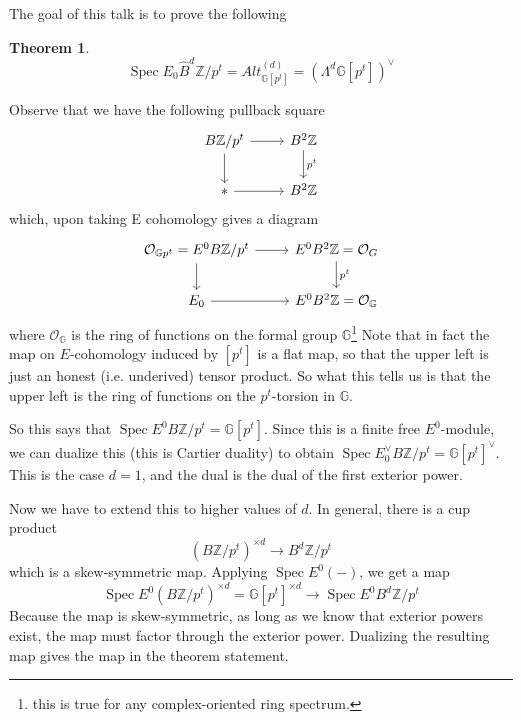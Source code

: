\documentclass{article}
\newcommand{\Z}{{\mathbb{Z}}}
\renewcommand{\G}{{\mathbb{G}}}
\DeclareMathOperator{\Spec}{Spec}
\theoremstyle{definition} \newtheorem*{defn}{Definition}
\theoremstyle{plain} \newtheorem*{prop}{Proposition}
\theoremstyle{plain} \newtheorem*{lemma}{Lemma}
\theoremstyle{plain} \newtheorem*{cor}{Corollary}
\theoremstyle{remark} \newtheorem*{ex}{Example}
\theoremstyle{remark} \newtheorem*{exs}{Examples}
\theoremstyle{remark} \newtheorem*{nonex}{Non-example}
\theoremstyle{remark} \newtheorem*{rmk}{Remark}
\theoremstyle{remark} \newtheorem*{exc}{Exercise}
\theoremstyle{remark} \newtheorem*{idea}{Idea}
\theoremstyle{remark} \newtheorem*{obs}{Observation}
\theoremstyle{plain} \newtheorem*{theorem}{Theorem}
\theoremstyle{plain} \newtheorem*{conj}{Conjecture}
\theoremstyle{remark} \newtheorem*{q}{Question}
\theoremstyle{definition} \newtheorem*{fact}{Fact}
\theoremstyle{definition} \newtheorem*{facts}{Facts}
\theoremstyle{remark} \newtheorem*{ntn}{Notation}
\theoremstyle{remark} \newtheorem*{goal}{Goal}
\theoremstyle{remark} \newtheorem*{sketch}{Sketch}
\theoremstyle{definition} \newtheorem{claim}{Claim}
\newenvironment{proofsketch}{%
  \renewcommand{\proofname}{Proof Sketch}\proof}{\endproof}
\begin{document}
The goal of this talk is to prove the following
\begin{theorem}
	\begin{equation}\label{eq:pvkthm1} 
		\Spec E_0\hat B^d \Z/p^t  = Alt^{(d)}_{\G[p^t]} = \left(\Lambda^d \G[p^t] \right)^\vee 
	\end{equation}
\end{theorem}
\begin{proofsketch}[Case d = 1]
	Observe that we have the following pullback square 
	\begin{equation}
	\begin{tikzcd}
		B\Z/p^t \ar[r] \ar[d]	& B^2 \Z \ar[d,"p^t"] \\
		* \ar[r] & B^2 \Z
	\end{tikzcd}
	\end{equation}
	which, upon taking E cohomology gives a diagram
	\begin{equation}
	\begin{tikzcd}
		\mathcal{O}_{\G p^t} = E^0 B\Z/p^t \ar[r] \ar[d]	& E^0 B^2 \Z \ar[d,"p^t"] = \mathcal{O}_G \\
		E_0 \ar[r] & E^0 B^2 \Z = \mathcal{O}_\G
	\end{tikzcd}
	\end{equation}
	where $ \mathcal{O}_\G $ is the ring of functions on the formal group $ \G $\footnote{this is true for any complex-oriented ring spectrum.} 
	Note that in fact the map on $ E $-cohomology induced by $ [p^t] $ is a flat map, so that the upper left is just an honest (i.e. underived) tensor product. 
	So what this tells us is that the upper left is the ring of functions on the $ p^t $-torsion in $ \G $. 

	So this says that $ \Spec E^0 B \Z/p^t = \G [p^t] $. 
	Since this is a finite free $ E^0 $-module, we can dualize this (this is Cartier duality) to obtain $ \Spec E_0^\vee B\Z/p^t  = \G[p^t]^\vee $. 
	This is the case $ d = 1 $, and the dual is the dual of the first exterior power. 

	Now we have to extend this to higher values of $ d $. 
	In general, there is a cup product
	\begin{equation*}
		(B \Z/p^t)^{\times d} \to B^d \Z/p^t
	\end{equation*}
	which is a skew-symmetric map. 
	Applying $ \Spec E^0 (-) $, we get a map
	\begin{equation*}
		\Spec E^0(B \Z/p^t)^{\times d} = \G[p^t]^{\times d} \to \Spec E^0 B^d \Z/p^t
	\end{equation*}
	Because the map is skew-symmetric, as long as we know that exterior powers exist, the map must factor through the exterior power. 
	Dualizing the resulting map gives the map in the theorem statement. 


\end{proofsketch}
\end{document}
